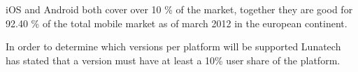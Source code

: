 iOS and Android both cover over 10 \% of the market, together they are good for 92.40 \% of the total mobile market as of march 2012 in the european continent.







In order to determine which versions per platform will be supported Lunatech has stated that a version must have at least a 10\% user share of the platform. 

